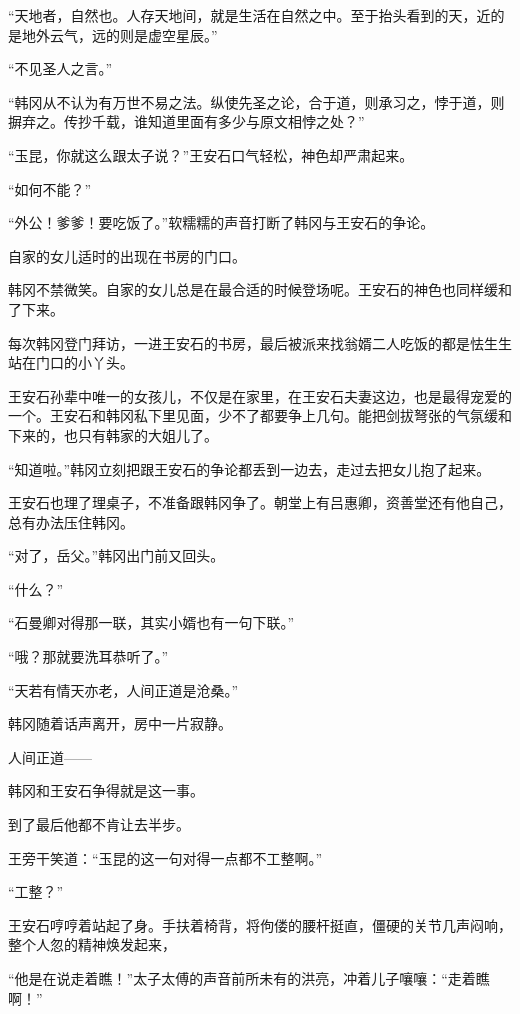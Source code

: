 “天地者，自然也。人存天地间，就是生活在自然之中。至于抬头看到的天，近的是地外云气，远的则是虚空星辰。”

“不见圣人之言。”

“韩冈从不认为有万世不易之法。纵使先圣之论，合于道，则承习之，悖于道，则摒弃之。传抄千载，谁知道里面有多少与原文相悖之处？”

“玉昆，你就这么跟太子说？”王安石口气轻松，神色却严肃起来。

“如何不能？”

“外公！爹爹！要吃饭了。”软糯糯的声音打断了韩冈与王安石的争论。

自家的女儿适时的出现在书房的门口。

韩冈不禁微笑。自家的女儿总是在最合适的时候登场呢。王安石的神色也同样缓和了下来。

每次韩冈登门拜访，一进王安石的书房，最后被派来找翁婿二人吃饭的都是怯生生站在门口的小丫头。

王安石孙辈中唯一的女孩儿，不仅是在家里，在王安石夫妻这边，也是最得宠爱的一个。王安石和韩冈私下里见面，少不了都要争上几句。能把剑拔弩张的气氛缓和下来的，也只有韩家的大姐儿了。

“知道啦。”韩冈立刻把跟王安石的争论都丢到一边去，走过去把女儿抱了起来。

王安石也理了理桌子，不准备跟韩冈争了。朝堂上有吕惠卿，资善堂还有他自己，总有办法压住韩冈。

“对了，岳父。”韩冈出门前又回头。

“什么？”

“石曼卿对得那一联，其实小婿也有一句下联。”

“哦？那就要洗耳恭听了。”

“天若有情天亦老，人间正道是沧桑。”

韩冈随着话声离开，房中一片寂静。

人间正道——

韩冈和王安石争得就是这一事。

到了最后他都不肯让去半步。

王旁干笑道：“玉昆的这一句对得一点都不工整啊。”

“工整？”

王安石哼哼着站起了身。手扶着椅背，将佝偻的腰杆挺直，僵硬的关节几声闷响，整个人忽的精神焕发起来，

“他是在说走着瞧！”太子太傅的声音前所未有的洪亮，冲着儿子嚷嚷：“走着瞧啊！”

